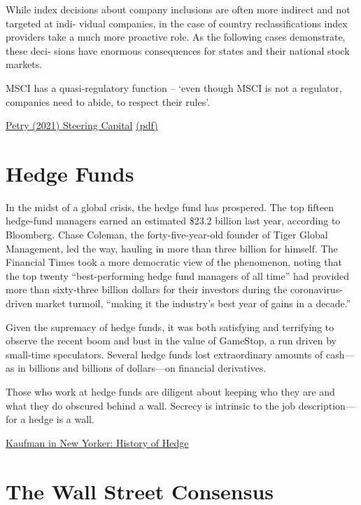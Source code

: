 \documentclass[
]{book}
\begin{document}
While index
decisions about company inclusions are often more indirect and not targeted at indi-
vidual companies, in the case of country reclassifications index providers take a much
more proactive role. As the following cases demonstrate, these deci-
sions have enormous consequences for states and their national stock markets.

MSCI has a quasi-regulatory function -- `even though MSCI is not a regulator, companies need
to abide, to respect their rules'.

\href{https://www.tandfonline.com/doi/full/10.1080/09692290.2019.1699147}{Petry (2021) Steering Capital}
\href{pdf/Petry_2021_Steering_Capital.pdf}{(pdf)}

\hypertarget{hedge-funds}{%
\section{Hedge Funds}\label{hedge-funds}}

In the midst of a global crisis, the hedge fund has prospered. The top fifteen hedge-fund managers earned an estimated \$23.2 billion last year, according to Bloomberg. Chase Coleman, the forty-five-year-old founder of Tiger Global Management, led the way, hauling in more than three billion for himself. The Financial Times took a more democratic view of the phenomenon, noting that the top twenty ``best-performing hedge fund managers of all time'' had provided more than sixty-three billion dollars for their investors during the coronavirus-driven market turmoil, ``making it the industry's best year of gains in a decade.''

Given the supremacy of hedge funds, it was both satisfying and terrifying to observe the recent boom and bust in the value of GameStop, a run driven by small-time speculators. Several hedge funds lost extraordinary amounts of cash---as in billions and billions of dollars---on financial derivatives.

Those who work at hedge funds are diligent about keeping who they are and what they do obscured behind a wall. Secrecy is intrinsic to the job description---for a hedge is a wall.

\href{https://www.newyorker.com/culture/culture-desk/a-brief-history-of-the-hedge-fund}{Kaufman in New Yorker: History of Hedge}

\hypertarget{the-wall-street-consensus}{%
\section{The Wall Street Consensus}\label{the-wall-street-consensus}}
\end{document}
